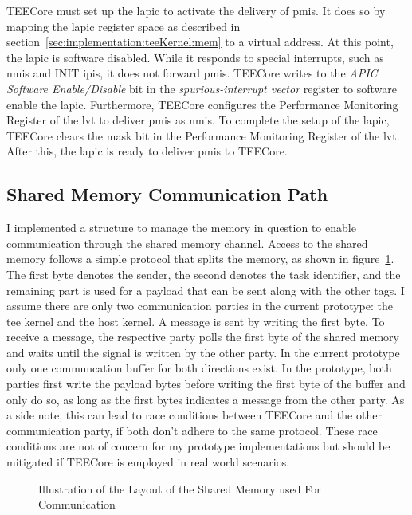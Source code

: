 TEECore must set up the \gls{lapic} to activate the delivery of \glspl{pmi}. It
does so by mapping the \gls{lapic} register space as described in
section~\ref{sec:implementation:teeKernel:mem} to a virtual address. At this
point, the \gls{lapic} is software disabled. While it responds to special
interrupts, such as \glspl{nmi} and INIT \glspl{ipi}, it does not forward
\glspl{pmi}. TEECore writes to the \textit{APIC Software Enable/Disable} bit in
the \textit{spurious-interrupt vector} register to software enable the
\gls{lapic}. Furthermore, TEECore configures the Performance Monitoring Register
of the \gls{lvt} to deliver \glspl{pmi} as \glspl{nmi}. To complete the setup of
the \gls{lapic}, TEECore clears the mask bit in the Performance Monitoring
Register of the \gls{lvt}. After this, the \gls{lapic} is ready to deliver
\glspl{pmi} to TEECore.

\subsection{Shared Memory Communication Path}
\label{sec:implementation:teeKernel:shared}
I implemented a structure to manage the memory in question to enable
communication through the shared memory channel. Access to the shared memory
follows a simple protocol that splits the memory, as shown in
figure~\ref{fig:impl:shared_mem_layout}. The first byte denotes the sender, the
second denotes the task identifier, and the remaining part is used for a payload
that can be sent along with the other tags. I assume there are only two
communication parties in the current prototype: the \gls{tee} kernel and the
host kernel. A message is sent by writing the first byte. To receive a message,
the respective party polls the first byte of the shared memory and waits until
the signal is written by the other party. In the current prototype only one
communcation buffer for both directions exist. In the prototype, both parties
first write the payload bytes before writing the first byte of the buffer and
only do so, as long as the first bytes indicates a message from the other party.
As a side note, this can lead to race conditions between TEECore and the other
communication party, if both don't adhere to the same protocol. These race
conditions are not of concern for my prototype implementations but should be
mitigated if TEECore is employed in real world scenarios.\\

\begin{center}
  \begin{figure}[]
    \centering
    
    \caption{Illustration of the Layout of the Shared Memory used For Communication}
    \label{fig:impl:shared_mem_layout}
  \end{figure}
\end{center}

